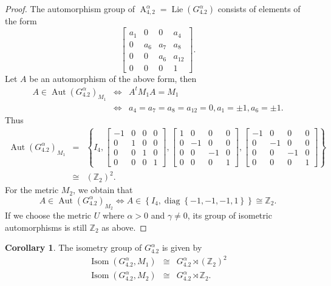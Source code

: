 \documentclass[12pt,a4paper,twoside]{article}
\theoremstyle{definition}
\newtheorem{corollary}[theorem]{Corollary}
\begin{document}
\begin{proof}
The automorphism group of $\operatorname{A}_{4, 2}^{\alpha} = \operatorname{Lie}(G_{4.2}^{\alpha})$ consists of elements of the form \cite{christodoulakis2003corrigendum}
$$\begin{bmatrix}
a_1 & 0 & 0 & a_4\\
0 & a_6 & a_7 & a_8\\
0 & 0 & a_6 & a_{12}\\
0 & 0 & 0 & 1
\end{bmatrix}.$$
Let $A$ be an automorphism of the above form, then
\begin{eqnarray*}
A \in \operatorname{Aut}\left(G_{4.2}^{\alpha}\right)_{M_1} &\Leftrightarrow& A^tM_1A = M_1\\
&\Leftrightarrow& a_4 = a_7 = a_8 = a_{12} = 0, a_1 = \pm1, a_6 = \pm1.
\end{eqnarray*}
Thus
\begin{eqnarray*}
\operatorname{Aut}\left(G_{4.2}^{\alpha}\right)_{M_1} &=& \left\lbrace I_4, \begin{bmatrix}
-1 & 0 & 0 & 0\\
0 & 1 & 0 & 0\\
0 & 0 & 1 & 0\\
0 & 0 & 0 & 1
\end{bmatrix}, \begin{bmatrix}
1 & 0 & 0 & 0\\
0 & -1 & 0 & 0\\
0 & 0 & -1 & 0\\
0 & 0 & 0 & 1
\end{bmatrix}, \begin{bmatrix}
-1 & 0 & 0 & 0\\
0 & -1 & 0 & 0\\
0 & 0 & -1 & 0\\
0 & 0 & 0 & 1
\end{bmatrix} \right\rbrace\\
&\cong& (\mathbb{Z}_2)^2.
\end{eqnarray*}
For the metric $M_2$, we obtain that 
$$A \in \operatorname{Aut}\left(G_{4.2}^{\alpha}\right)_{M_2} \Leftrightarrow A \in \left\lbrace I_4, \operatorname{diag}\left\lbrace -1, -1, -1, 1\right\rbrace \right\rbrace \cong \mathbb{Z}_2.$$
If we choose the metric $U$ where $\alpha > 0$ and $\gamma \neq 0$, its group of isometric automorphisms is still $\mathbb{Z}_2$ as above.
\end{proof}
\begin{corollary}
The isometry group of $G_{4.2}^{\alpha}$ is given by
\begin{eqnarray*}
\operatorname{Isom}\left(G_{4.2}^{\alpha}, M_{1}\right)  &\cong& G_{4.2}^{\alpha} \rtimes \left(\mathbb{Z}_2\right)^2\\
\operatorname{Isom}\left(G_{4.2}^{\alpha}, M_{2}\right)  &\cong& G_{4.2}^{\alpha} \rtimes \mathbb{Z}_2.
\end{eqnarray*}
\end{corollary}
\end{document}
